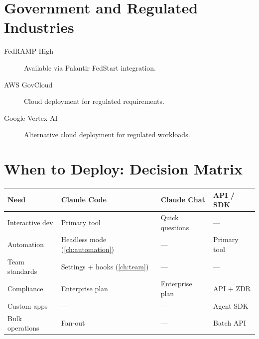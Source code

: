 \section{Government and Regulated Industries}
\label{sec:government}


\begin{description}
  \item[FedRAMP High] Available via Palantir FedStart
    integration.
  \item[AWS GovCloud] Cloud deployment for regulated
    requirements.
  \item[Google Vertex AI] Alternative cloud deployment for
    regulated workloads.
\end{description}


\section{When to Deploy: Decision Matrix}

\begin{fullwidth}
\begin{tabular}{@{}p{3cm}p{3cm}p{3cm}p{3cm}@{}}
\toprule
\textbf{Need} & \textbf{Claude Code} & \textbf{Claude Chat} & \textbf{API / SDK} \\
\midrule
Interactive dev & Primary tool & Quick questions & --- \\
Automation & Headless mode (\cref{ch:automation}) & --- & Primary tool \\
Team standards & Settings + hooks (\cref{ch:team}) & --- & --- \\
Compliance & Enterprise plan & Enterprise plan & API + ZDR \\
Custom apps & --- & --- & Agent SDK \\
Bulk operations & Fan-out & --- & Batch API \\
\bottomrule
\end{tabular}
\end{fullwidth}

